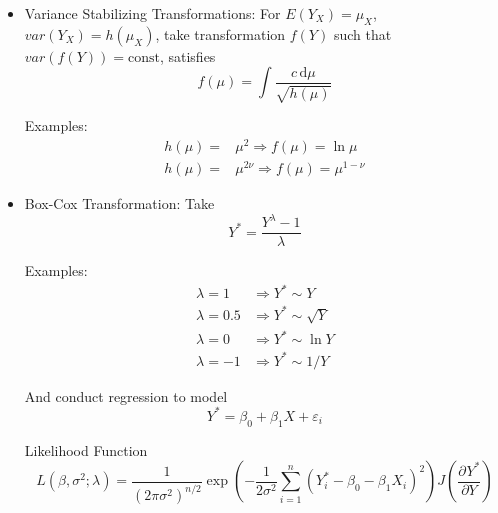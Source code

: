         \begin{itemize}[topsep=2pt,itemsep=2pt]
            \item Variance Stabilizing Transformations:
                For $ E(Y_X)=\mu_X$, $ var(Y_X)=h(\mu_X) $, take transformation $ f(Y) $ such that $ var(f(Y))=\mathrm{const} $, satisfies
                \begin{equation}
                    f(\mu)=\int\dfrac{c\,\mathrm{d}\mu}{\sqrt{h(\mu)}} 
                \end{equation}
    
                Examples:
                \begin{align*}
                    h(\mu)=&\mu^2\Rightarrow f(\mu )=\ln\mu\\
                    h(\mu)=&\mu^{2\nu}\Rightarrow f(\mu )=\mu ^{1-\nu}
                \end{align*}
            
            \item Box-Cox Transformation: Take 
        \begin{equation}
            Y^*=\dfrac{Y^\lambda -1}{\lambda }
        \end{equation}
    
                Examples:
            \begin{align*}
                \lambda =1&\Rightarrow Y^*\sim Y\\
                \lambda =0.5&\Rightarrow Y^*\sim \sqrt{Y}\\
                \lambda =0&\Rightarrow Y^*\sim \ln Y\\
                \lambda =-1&\Rightarrow Y^*\sim 1/Y
            \end{align*}
        
            And conduct regression to model
            \begin{equation}
                Y^* =\beta _0+\beta _1X+\varepsilon_i 
            \end{equation}
            
            Likelihood Function
            \begin{equation}
                L(\beta ,\sigma ^2;\lambda )=\dfrac{1}{(2\pi\sigma ^2)^{n/2}}\exp\left( -\dfrac{1}{2\sigma ^2}\sum_{i=1}^n (Y_i^*-\beta _0-\beta _1X_i)^2 \right) J(\dfrac{\partial^{} Y^*}{\partial Y^{}})
            \end{equation}
    

\end{itemize}
